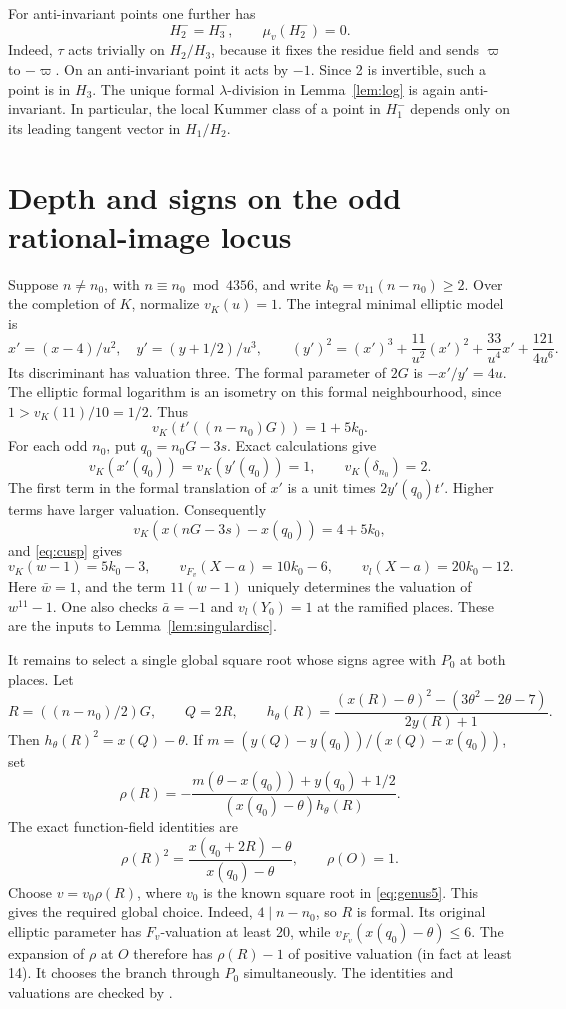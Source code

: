 \documentclass[11pt]{article}
\begin{document}
For anti-invariant points one further has
\begin{equation}\label{eq:H2}
 H_2^- = H_3^-,\qquad \mu_v(H_2^-)=0.
\end{equation}
Indeed, \(\tau\) acts trivially on \(H_2/H_3\), because it fixes the
residue field and sends \(\varpi\) to \(-\varpi\). On an
anti-invariant point it acts by \(-1\). Since 2 is invertible, such a
point is in \(H_3\). The unique formal \(\lambda\)-division in
Lemma~\ref{lem:log} is again anti-invariant. In particular, the local
Kummer class of a point in \(H_1^-\) depends only on its leading
tangent vector in \(H_1/H_2\).

\section{Depth and signs on the odd rational-image locus}
Suppose \(n\ne n_0\), with \(n\equiv n_0\bmod4356\), and write
\(k_0=v_{11}(n-n_0)\ge2\). Over the completion of \(K\), normalize
\(v_K(u)=1\). The integral minimal elliptic model is
\[
 x'=(x-4)/u^2,\quad y'=(y+1/2)/u^3,\qquad
 (y')^2=(x')^3+\frac{11}{u^2}(x')^2+
           \frac{33}{u^4}x'+\frac{121}{4u^6}.
\]
Its discriminant has valuation three. The formal parameter of \(2G\)
is \(-x'/y'=4u\). The elliptic formal logarithm is an isometry on
this formal neighbourhood, since \(1>v_K(11)/10=1/2\). Thus
\[
 v_K(t'((n-n_0)G))=1+5k_0.
\]
For each odd \(n_0\), put \(q_0=n_0G-3s\). Exact calculations give
\[
 v_K(x'(q_0))=v_K(y'(q_0))=1,\qquad v_K(\delta_{n_0})=2.
\]
The first term in the formal translation of \(x'\) is a unit times
\(2y'(q_0)t'\). Higher terms have larger valuation. Consequently
\[
 v_K(x(nG-3s)-x(q_0))=4+5k_0,
\]
and \eqref{eq:cusp} gives
\begin{equation}\label{eq:odddepth}
 v_K(w-1)=5k_0-3,\qquad
 v_{F_v}(X-a)=10k_0-6,\qquad
 v_l(X-a)=20k_0-12.
\end{equation}
Here \(\bar w=1\), and the term \(11(w-1)\) uniquely determines the
valuation of \(w^{11}-1\).
One also checks \(\bar a=-1\) and \(v_l(Y_0)=1\) at the ramified
places. These are the inputs to Lemma~\ref{lem:singulardisc}.

It remains to select a single global square root whose signs agree
with \(P_0\) at both places. Let
\[
 R=((n-n_0)/2)G,\qquad Q=2R,\qquad
 h_\theta(R)=\frac{(x(R)-\theta)^2-(3\theta^2-2\theta-7)}{2y(R)+1}.
\]
Then \(h_\theta(R)^2=x(Q)-\theta\). If
\(m=(y(Q)-y(q_0))/(x(Q)-x(q_0))\), set
\[
 \rho(R)=
 -\frac{m(\theta-x(q_0))+y(q_0)+1/2}
          {(x(q_0)-\theta)h_\theta(R)}.
\]
The exact function-field identities are
\[
 \rho(R)^2=\frac{x(q_0+2R)-\theta}{x(q_0)-\theta},
 \qquad \rho(O)=1.
\]
Choose \(v=v_0\rho(R)\), where \(v_0\) is the known square root in
\eqref{eq:genus5}. This gives the required global choice.
Indeed, \(4\mid n-n_0\), so \(R\) is formal. Its original elliptic
parameter has \(F_v\)-valuation at least 20, while
\(v_{F_v}(x(q_0)-\theta)\le6\).
The expansion of \(\rho\) at \(O\) therefore has \(\rho(R)-1\) of
positive valuation (in fact at least 14). It chooses the branch through
\(P_0\) simultaneously. The identities and valuations are checked by
.
\end{document}
